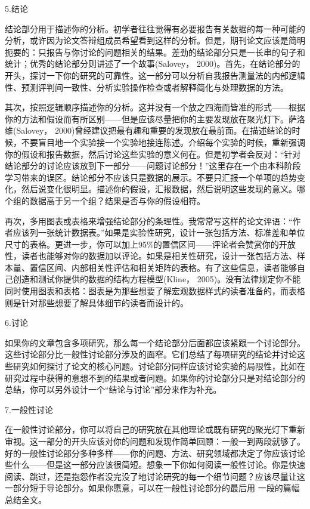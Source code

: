 {\kaishu 5.结论}

结论部分用于描述你的分析。初学者往往觉得有必要报告有关数据的每一种可能的分析，或许因为论文答辩组成员希望看到这样的分析。但是，期刊论文应该是简明扼要的：只报告与你讨论的问题相关的结果。差劲的结论部分只是一长串的句子和统计；优秀的结论部分则讲述了一个故事(Salovey， 2000)。首先，在结论部分的开头，探讨一下你的研究的可靠性。这一部分可以分析自我报告测量法的内部逻辑性、预测评判间一致性、分析实验操作检查或者解释简化与处理数据的方法。

其次，按照逻辑顺序描述你的分析。这并没有一个放之四海而皆准的形式——根据你的方法和假设而有所区别——但是应该尽量把你的主要发现放在聚光灯下。萨洛维(Salovey， 2000)曾经建议把最有趣和重要的发现放在最前面。在描述结论的时候，不要盲目地一个实验接一个实验地接连陈述。介绍每个实验的时候，重新强调你的假设和报告数据，然后讨论这些实验的意义何在。但是初学者会反对：“针对结论部分的讨论应该放到下一部分——问题讨论部分！”这里存在一个由本科阶段学习带来的误区。结论部分不应该只是数据的展示。不要只汇报一个单项的趋势变化，然后说变化很明显。描述你的假设，汇报数据，然后说明这些发现的意义。哪个组的数据高于另一个组？结果是否与你的假设相符。

再次，多用图表或表格来增强结论部分的条理性。我常常写这样的论文评语：“作者应该列一张统计数据表。”如果是实验性研究，设计一张包括方法、标准差和单位尺寸的表格。更进一步，你可以加上95\%的置信区间——评论者会赞赏你的开放性，读者也能够对你的数据加以评论。如果是相关性研究，设计一张包括方法、样本量、置信区间、内部相关性评估和相关矩阵的表格。有了这些信息，读者能够自己创造和测试你提供的数据的结构方程模型(Kline， 2005)。没有法律规定你不能同时使用图表和表格：图表是为那些想要了解宏观数据样式的读者准备的，而表格则是针对那些想要了解具体细节的读者而设计的。

{\kaishu 6.讨论}

如果你的文章包含多项研究，那么每一个结论部分后面都应该紧跟一个讨论部分。这些讨论部分比一般性讨论部分涉及的面窄。它们总结了每项研究的结论并讨论这些研究如何探讨了论文的核心问题。讨论部分同样应该讨论实验的局限性，比如在研究过程中获得的意想不到的结果或者问题。如果你的讨论部分只是对结论部分的总结，你可以另外设计一个“结论与讨论”部分来作为补充。

{\kaishu 7.一般性讨论}

在一般性讨论部分，你可以将自己的研究放在其他理论或既有研究的聚光灯下重新审视。这一部分的开头应该对你的问题和发现作简单回顾：一般一到两段就够了。好的一般性讨论部分多种多样——你的问题、方法、研究领域都决定了你应该讨论些什么——但是这一部分应该很简短。想象一下你如何阅读一般性讨论。你是快速阅读、跳过，还是抱怨作者没完没了地讨论研究的每一个细节问题？应该尽量让这一部分短于导论部分。如果你愿意，可以在一般性讨论部分的最后用
一段的篇幅总结全文。

